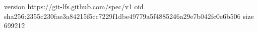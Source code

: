 version https://git-lfs.github.com/spec/v1
oid sha256:2355c230fae3a84215f5cc7229f1dbe49779a5f4885246a29e7b042fc0e6b506
size 699212
